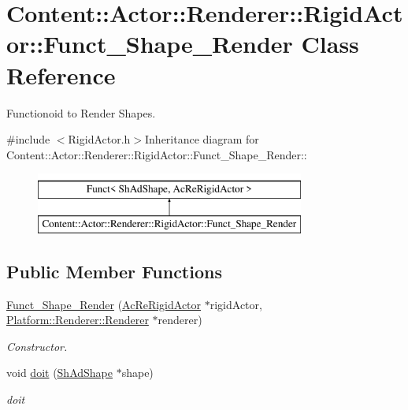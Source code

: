 \hypertarget{classContent_1_1Actor_1_1Renderer_1_1RigidActor_1_1Funct__Shape__Render}{
\section{Content::Actor::Renderer::RigidActor::Funct\_\-Shape\_\-Render Class Reference}
\label{classContent_1_1Actor_1_1Renderer_1_1RigidActor_1_1Funct__Shape__Render}
}


Functionoid to Render Shapes.  


{\ttfamily \#include $<$RigidActor.h$>$}Inheritance diagram for Content::Actor::Renderer::RigidActor::Funct\_\-Shape\_\-Render::\begin{figure}[H]
\begin{center}
\leavevmode
\includegraphics[height=2cm]{classContent_1_1Actor_1_1Renderer_1_1RigidActor_1_1Funct__Shape__Render}
\end{center}
\end{figure}
\subsection*{Public Member Functions}
\begin{DoxyCompactItemize}
\item 
\hypertarget{classContent_1_1Actor_1_1Renderer_1_1RigidActor_1_1Funct__Shape__Render_a28186ad3c0910c4484b9a119127ed532}{
\hyperlink{classContent_1_1Actor_1_1Renderer_1_1RigidActor_1_1Funct__Shape__Render_a28186ad3c0910c4484b9a119127ed532}{Funct\_\-Shape\_\-Render} (\hyperlink{classContent_1_1Actor_1_1Renderer_1_1RigidActor}{AcReRigidActor} $\ast$rigidActor, \hyperlink{classPlatform_1_1Renderer_1_1Renderer}{Platform::Renderer::Renderer} $\ast$renderer)}
\label{classContent_1_1Actor_1_1Renderer_1_1RigidActor_1_1Funct__Shape__Render_a28186ad3c0910c4484b9a119127ed532}

\begin{DoxyCompactList}\small\item\em Constructor. \item\end{DoxyCompactList}\item 
\hypertarget{classContent_1_1Actor_1_1Renderer_1_1RigidActor_1_1Funct__Shape__Render_a6d46432a4eee96774ca1d32484e3a325}{
void \hyperlink{classContent_1_1Actor_1_1Renderer_1_1RigidActor_1_1Funct__Shape__Render_a6d46432a4eee96774ca1d32484e3a325}{doit} (\hyperlink{classContent_1_1Shape_1_1Admin_1_1Shape}{ShAdShape} $\ast$shape)}
\label{classContent_1_1Actor_1_1Renderer_1_1RigidActor_1_1Funct__Shape__Render_a6d46432a4eee96774ca1d32484e3a325}

\begin{DoxyCompactList}\small\item\em doit \item\end{DoxyCompactList}\end{DoxyCompactItemize}

